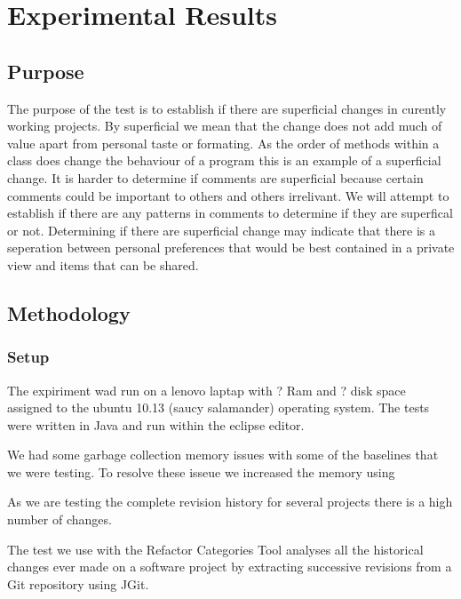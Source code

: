 
\chapter{Experimental Results}

\section{Purpose}
The purpose of the test is to establish if there are superficial changes in curently working projects.  By superficial we mean that the change does not add   much of value apart from personal taste or formating.  As the order of methods within a class does change the behaviour of a program this is an example of a superficial change.  It is harder to determine if comments are superficial because certain comments could be important to others and others irrelivant. We will attempt to establish if there are any patterns in comments to determine if they are superfical or not.  Determining if there are superficial change may indicate that there is a seperation between personal preferences that would be best contained in a private view and items that can be shared.    

\section{Methodology}
\subsection{Setup}
The expiriment wad run on a lenovo laptap with ? Ram and ? disk space assigned to the ubuntu 10.13 (saucy salamander) operating system.  The tests were written in Java and run within the eclipse editor.


We had some garbage collection memory issues with some of the baselines that we were testing. To resolve these isseue we increased the memory using
 

% 
% 
% 
% 
% 
% 
% 

As we are testing the complete revision history for several projects there is a high number of changes. 

The test we use with the Refactor Categories Tool analyses all the historical changes ever made on a software project by extracting successive revisions from a Git repository using JGit.

